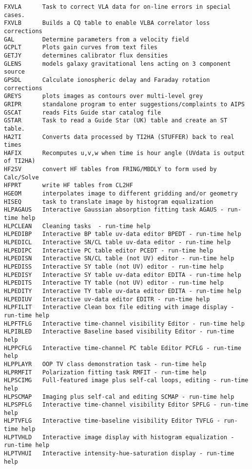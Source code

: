 \begin{verbatim}
FXVLA      Task to correct VLA data for on-line errors in special cases.
FXVLB      Builds a CQ table to enable VLBA correlator loss corrections
GAL        Determine parameters from a velocity field
GCPLT      Plots gain curves from text files
GETJY      determines calibrator flux densities
GLENS      models galaxy gravitational lens acting on 3 component source
GPSDL      Calculate ionospheric delay and Faraday rotation corrections
GREYS      plots images as contours over multi-level grey
GRIPR      standalone program to enter suggestions/complaints to AIPS
GSCAT      reads Fits Guide star catalog file
GSTAR      Task to read a Guide Star (UK) table and create an ST table.
HA2TI      Converts data processed by TI2HA (STUFFER) back to real times
HAFIX      Recomputes u,v,w when time is hour angle (UVdata is output of TI2HA)
HF2SV      convert HF tables from FRING/MBDLY to form used by Calc/Solve
HFPRT      write HF tables from CL2HF
HGEOM      interpolates image to different gridding and/or geometry
HISEQ      task to translate image by histogram equalization
HLPAGAUS   Interactive Gaussian absorption fitting task AGAUS - run-time help
HLPCLEAN   Cleaning tasks  - run-time help
HLPEDIBP   Interactive BP table uv-data editor BPEDT - run-time help
HLPEDICL   Interactive SN/CL table uv-data editor - run-time help
HLPEDIPC   Interactive PC table editor PCEDT - run-time help
HLPEDISN   Interactive SN/CL table (not UV) editor - run-time help
HLPEDISS   Interactive SY table (not UV) editor - run-time help
HLPEDISY   Interactive SY table uv-data editor EDITA - run-time help
HLPEDITS   Interactive TY table (not UV) editor - run-time help
HLPEDITY   Interactive TY table uv-data editor EDITA - run-time help
HLPEDIUV   Interactive uv-data editor EDITR - run-time help
HLPFILIT   Interactive Clean box file editing with image display - run-time help
HLPFTFLG   Interactive time-channel visibility Editor - run-time help
HLPIBLED   Interactive Baseline based visibility Editor - run-time help
HLPPCFLG   Interactive time-channel PC table Editor PCFLG - run-time help
HLPPLAYR   OOP TV class demonstration task - run-time help
HLPRMFIT   Polarization fitting task RMFIT - run-time help
HLPSCIMG   Full-featured image plus self-cal loops, editing - run-time help
HLPSCMAP   Imaging plus self-cal and editing SCMAP - run-time help
HLPSPFLG   Interactive time-channel visibility Editor SPFLG - run-time help
HLPTVFLG   Interactive time-baseline visibility Editor TVFLG - run-time help
HLPTVHLD   Interactive image display with histogram equalization - run-time help
HLPTVHUI   Interactive intensity-hue-saturation display - run-time help

\end{verbatim}
